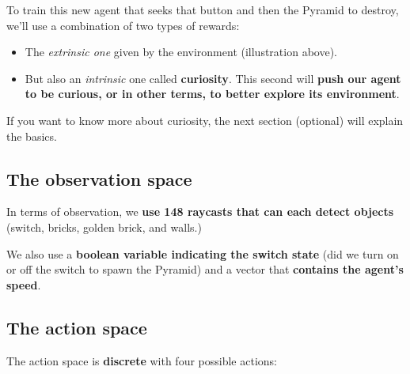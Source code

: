 \documentclass[11pt,a4paper]{article}
\begin{document}
To train this new agent that seeks that button and then the Pyramid to destroy, we'll use a combination of two types of rewards:

\begin{itemize}
\tightlist
\item
  The \emph{extrinsic one} given by the environment (illustration above).
\item
  But also an \emph{intrinsic} one called \textbf{curiosity}. This second will \textbf{push our agent to be curious, or in other terms, to better explore its environment}.
\end{itemize}

If you want to know more about curiosity, the next section (optional) will explain the basics.

\subsection{The observation space}\label{the-observation-space-1}

In terms of observation, we \textbf{use 148 raycasts that can each detect objects} (switch, bricks, golden brick, and walls.)


We also use a \textbf{boolean variable indicating the switch state} (did we turn on or off the switch to spawn the Pyramid) and a vector that \textbf{contains the agent's speed}.


\subsection{The action space}\label{the-action-space-1}

The action space is \textbf{discrete} with four possible actions:

\end{document}
